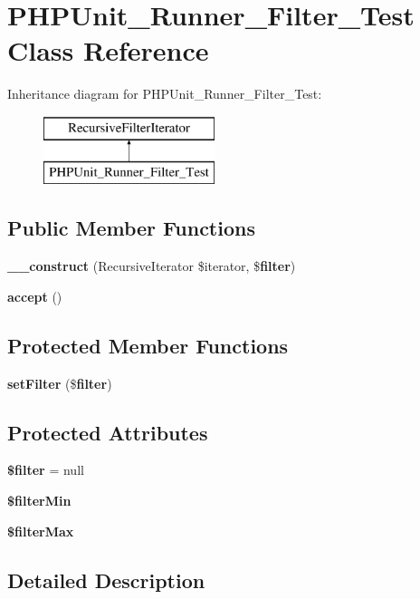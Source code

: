 \section{P\+H\+P\+Unit\+\_\+\+Runner\+\_\+\+Filter\+\_\+\+Test Class Reference}
\label{class_p_h_p_unit___runner___filter___test}
Inheritance diagram for P\+H\+P\+Unit\+\_\+\+Runner\+\_\+\+Filter\+\_\+\+Test\+:\begin{figure}[H]
\begin{center}
\leavevmode
\includegraphics[height=2.000000cm]{class_p_h_p_unit___runner___filter___test}
\end{center}
\end{figure}
\subsection*{Public Member Functions}
\begin{DoxyCompactItemize}
\item 
{\bf \+\_\+\+\_\+construct} (Recursive\+Iterator \$iterator, \${\bf filter})
\item 
{\bf accept} ()
\end{DoxyCompactItemize}
\subsection*{Protected Member Functions}
\begin{DoxyCompactItemize}
\item 
{\bf set\+Filter} (\${\bf filter})
\end{DoxyCompactItemize}
\subsection*{Protected Attributes}
\begin{DoxyCompactItemize}
\item 
{\bf \$filter} = null
\item 
{\bf \$filter\+Min}
\item 
{\bf \$filter\+Max}
\end{DoxyCompactItemize}


\subsection{Detailed Description}


